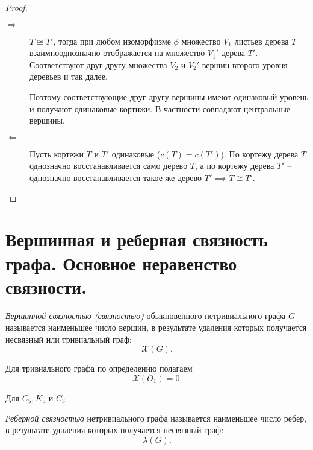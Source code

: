 \begin{proof}\leavevmode
    \begin{description}
        \item[$ \boxed{\Rightarrow} $] $ T \cong T' $, тогда при любом изоморфизме $ \phi $ множество $ V_1 $ листьев дерева $ T $ взаимнооднозначно отображается на множество $ V_1' $ дерева $ T' $. Соответствуют друг другу множества $ V_2 $ и $ V_2' $ вершин второго уровня деревьев и так далее.

              Поэтому соответствующие друг другу вершины имеют одинаковый уровень и получают одинаковые кортижи. В частности совпадают центральные вершины.

        \item[$ \boxed{\Leftarrow} $] Пусть кортежи $ T $ и $ T' $ одинаковые ($ c(T) = c(T') $). По кортежу дерева $ T $ однозначно восстанавливается само дерево $ T $, а по кортежу дерева $ T' $ -- однозначно восстанавливается такое же дерево $ T' \implies T \cong T' $.
    \end{description}
\end{proof}

\section{Вершинная и реберная связность графа. Основное неравенство связности.}

\begin{definition}
    \emph{Вершинной связностью (связностью)} обыкновенного нетривиального графа $ G $ называется наименьшее число вершин, в результате удаления которых получается несвязный или тривиальный граф:
    \[
        \mathcal{X}(G).
    \]
\end{definition}

\begin{note}
    Для тривиального графа по определению полагаем
    \[
        \mathcal{X}(O_1) = 0.
    \]
\end{note}

\begin{example}
    Для $ C_5,K_5 $ и $ C_3 $
    \begin{figure}[H]
        \centering
        \label{fig:fig_27}
    \end{figure}
\end{example}

\newpage

\begin{definition}
    \emph{Реберной связностью} нетривиального графа называется наименьшее число ребер, в результате удаления которых получается несвязный граф:
    \[
        \lambda(G).
    \]
\end{definition}

